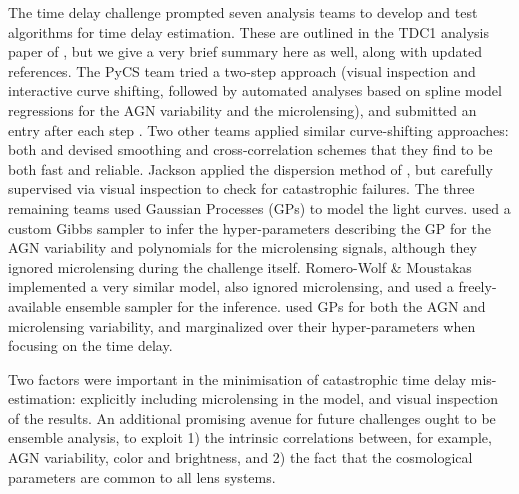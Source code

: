 The time delay challenge prompted seven analysis teams to develop and
test algorithms for time delay estimation. These are outlined in the
TDC1 analysis paper of \citet{LiaoEtal2015}, but we give a very brief
summary here as well, along with updated references.
The PyCS team tried a two-step approach (visual inspection and
interactive curve shifting, followed by automated analyses based on
spline model regressions for the AGN variability and the microlensing),
and submitted an entry after each step
\citep{BonvinEtal2016}. Two other teams applied similar
curve-shifting approaches: both \citet{A+S2015} and \citet{RK++2015}
devised smoothing and cross-correlation schemes that they find to be
both fast and reliable. Jackson applied the dispersion method of
\citet{Pelt++96}, but carefully supervised via visual inspection to
check for  catastrophic failures.  The three remaining teams used
Gaussian Processes (GPs) to model the light curves. \citet{TakEtal2016}
used a custom Gibbs sampler to infer the hyper-parameters describing the
GP for the AGN variability and polynomials for the microlensing signals,
although they ignored microlensing during the challenge itself.
Romero-Wolf \& Moustakas implemented a very similar model, also ignored
microlensing, and used a freely-available ensemble sampler for the
inference. \citet{H+L2014} used GPs for both the AGN and microlensing
variability, and marginalized over their hyper-parameters when focusing
on the time delay.

Two factors were important in the minimisation of catastrophic time
delay mis-estimation: explicitly including microlensing in the model,
and  visual inspection of the results. An additional promising avenue
for future challenges ought to be ensemble analysis, to exploit 1) the
intrinsic correlations between, for example, AGN variability, color and
brightness, and 2) the fact that  the cosmological parameters are common
to all lens systems.
